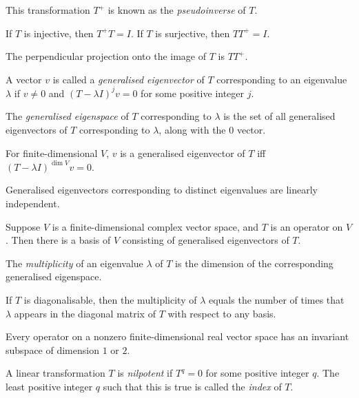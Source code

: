 \begin{defn}
  This transformation $T^+$ is known as the \emph{pseudoinverse} of $T$.
\end{defn}
\begin{prop}
    If $T$ is injective, then $T^+T=I$. If $T$ is surjective, then $TT^+=I$.
\end{prop}
\begin{prop}
    The perpendicular projection onto the image of $T$ is $TT^+$.
\end{prop}
\begin{defn}
  A vector $v$ is called a \emph{generalised eigenvector} of $T$ corresponding
  to an eigenvalue $\lambda$ if $v\ne 0$ and $(T-\lambda I)^j v=0$ for some
  positive integer $j$.

  The \emph{generalised eigenspace} of $T$ corresponding to $\lambda$ is the set
  of all generalised eigenvectors of $T$ corresponding to $\lambda$, along with
  the $0$ vector.
\end{defn}
\begin{prop}
  For finite-dimensional $V$, 
  $v$ is a generalised eigenvector of $T$ iff $(T-\lambda I)^{\dim V}v=0$.
\end{prop}
\begin{prop}
  Generalised eigenvectors corresponding to distinct eigenvalues are linearly
  independent.
\end{prop}
\begin{prop}
  Suppose $V$ is a finite-dimensional complex vector space, and $T$ is an
  operator on $V$. Then there is a basis of $V$ consisting of generalised
  eigenvectors of $T$.
\end{prop}
\begin{defn}
  The \emph{multiplicity} of an eigenvalue $\lambda$ of $T$ is the dimension of
  the corresponding generalised eigenspace.
\end{defn}
\begin{prop}
  If $T$ is diagonalisable, then the multiplicity of $\lambda$ equals the number
  of times that $\lambda$ appears in the diagonal matrix of $T$ with respect to
  any basis.
\end{prop}
\begin{prop}
  Every operator on a nonzero finite-dimensional real vector space has an invariant
  subspace of dimension $1$ or $2$.
\end{prop}
\begin{defn}
  A linear transformation $T$ is \emph{nilpotent} if $T^q=0$ for some positive
  integer $q$. The least positive integer $q$ such that this is true is called
  the \emph{index} of $T$.
\end{defn}
